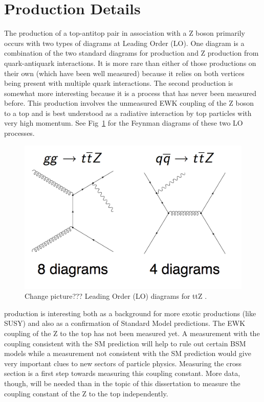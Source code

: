 	\section{\ttZ Production Details}
	The production of a top-antitop pair in association with a Z boson primarily occurs with two types of diagrams at Leading Order (LO). One diagram is a combination of the two standard diagrams for \ttbar production and Z production from quark-antiquark interactions. It is more rare than either of those productions on their own (which have been well measured) because it relies on both vertices being present with multiple quark interactions. The second production is somewhat more interesting because it is a process that has never been measured before. This production involves the unmeasured EWK coupling of the Z boson to a top and is best understood as a radiative interaction by top particles with very high momentum. See Fig~\ref{fig:ttz_LO_diagrams} for the Feynman diagrams of these two LO processes.\\
	\begin{figure}[h]
\begin{center}
\includegraphics[width=0.7\linewidth]{Figs/ttz_LO_diagrams.png}
\caption{\label{fig:ttz_LO_diagrams}
Change picture??? Leading Order (LO) diagrams for ttZ . 
}
\end{center}
\end{figure}

	\ttZ production is interesting both as a background for more exotic productions (like SUSY) and also as a confirmation of Standard Model predictions. The EWK coupling of the Z to the top has not been measured yet. A measurement with the coupling consistent with the SM prediction will help to rule out certain BSM models while a measurement not consistent with the SM prediction would give very important clues to new sectors of particle physics. Measuring the \ttZ cross section is a first step towards measuring this coupling constant. More data, though, will be needed than in the topic of this dissertation to measure the coupling constant of the Z to the top independently.\\
	
